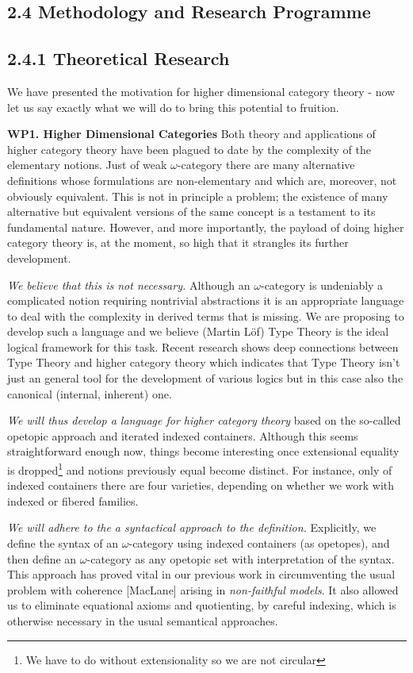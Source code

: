 \subsection*{2.4 \gap Methodology and Research  Programme}\label{sec:detailed}

\subsection*{2.4.1 \gap Theoretical Research} 
%
We have presented the motivation for higher dimensional category
theory - now let us say exactly what we will do to bring this
potential to fruition.

{\bf WP1. Higher Dimensional Categories}
%
Both theory and applications of higher category theory have been
plagued to date by the complexity of the elementary notions. 
Just of weak $\omega$-category there are many alternative
definitions whose formulations are non-elementary and which
are, moreover, not obviously equivalent. This is not in principle a
problem; the existence of many alternative but equivalent versions of
the same concept is a testament to its fundamental nature.  However,
and more importantly, the payload of doing higher category theory is,
at the moment, so high that it strangles its further development.

\emph{We believe that this is not necessary.} Although an
$\omega$-category is undeniably a complicated notion requiring
nontrivial abstractions it is an appropriate language to deal with the
complexity in derived terms that is missing. We are proposing to
develop such a language and we believe (Martin L\"of) Type Theory is
the ideal logical framework for this task. Recent research shows deep
connections between Type Theory and higher category theory which
indicates that Type Theory isn't just an general tool for the
development of various logics but in this case also the
canonical (internal, inherent) one.

\emph{We will thus develop a language for higher category theory}
based on the so-called opetopic approach and iterated indexed
containers.  Although this seems straightforward enough now, things
become interesting once extensional equality is dropped\footnote{We
  have to do without extensionality so we are not circular} and notions
previously equal become distinct. For instance, only of indexed
containers there are four varieties, depending on whether we work with
indexed or fibered families.

\emph{We will adhere to the a syntactical approach to the definition.}
Explicitly, we define the syntax of an $\omega$-category using
indexed containers (as opetopes), and then define an $\omega$-category
as any opetopic set with interpretation of the syntax. This approach
has proved vital in our previous work \cite{} in circumventing the
usual problem with coherence [MacLane] arising in \textit{non-faithful
models}. It also allowed us to eliminate equational axioms and
quotienting, by careful indexing, which is otherwise necessary in the
usual semantical approaches.

